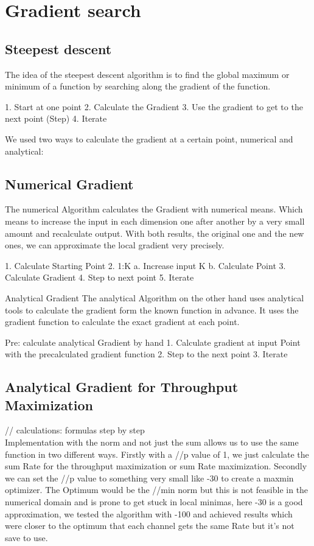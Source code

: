 \documentclass[9pt,draft]{report}
\begin{document}
\chapter{Gradient search}
\section{Steepest descent}
The idea of the steepest descent algorithm is to find the global maximum or minimum of a function by searching along the gradient of the function.
\begin{algorithm}
	1.	Start at one point
	2.	Calculate the Gradient
	3.	Use the gradient to get to the next point (Step)
	4.	Iterate
\end{algorithm}
We used two ways to calculate the gradient at a certain point, numerical and analytical:

\section{Numerical Gradient}
The numerical Algorithm calculates the Gradient with numerical means. Which means to increase the input in each dimension one after another by a very small amount and recalculate output. With both results, the original one and the new ones, we can approximate the local gradient very precisely.
\begin{algorithm}
	1.	Calculate Starting Point
	2.	1:K 
	a.	Increase input K
	b.	Calculate Point
	3.	Calculate Gradient
	4.	Step to next point
	5.	Iterate
\end{algorithm}
Analytical Gradient
The analytical Algorithm on the other hand uses analytical tools to calculate the gradient form the known function in advance. It uses the gradient function to calculate the exact gradient at each point.
\begin{algorithm}
	Pre: calculate analytical Gradient by hand
	1.	Calculate gradient at input Point with the precalculated gradient function
	2.	Step to the next point
	3.	Iterate
\end{algorithm}

\section{Analytical Gradient for Throughput Maximization}
// calculations: formulas step by step\\
Implementation with the norm and not just the sum allows us to use the same function in two different ways. Firstly with a //p value of 1, we just calculate the sum Rate for the throughput maximization or sum Rate maximization. Secondly we can set the //p value to something very small like -30 to create a maxmin optimizer. The Optimum would be the //min norm but this is not feasible in the numerical domain and is prone to get stuck in local minimas, here -30 is a good approximation, we tested the algorithm with -100 and achieved results which were closer to the optimum that each channel gets the same Rate but it’s not save to use.
\end{document}

